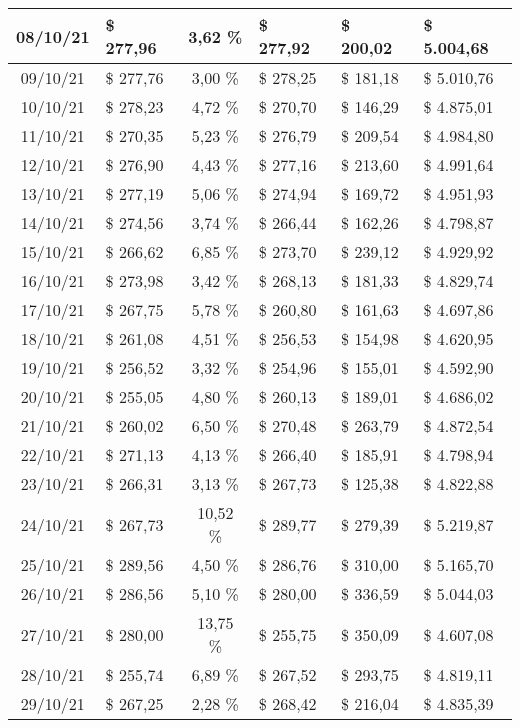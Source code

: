 \begin{center}
\begin{small}
\begin{longtable}{|c|l|c|l|l|l|}
08/10/21 & \$ 277,96 & 3,62 \% & \$ 277,92 & \$ 200,02 & \$ 5.004,68 \\ \hline
09/10/21 & \$ 277,76 & 3,00 \% & \$ 278,25 & \$ 181,18 & \$ 5.010,76 \\ \hline
10/10/21 & \$ 278,23 & 4,72 \% & \$ 270,70 & \$ 146,29 & \$ 4.875,01 \\ \hline
11/10/21 & \$ 270,35 & 5,23 \% & \$ 276,79 & \$ 209,54 & \$ 4.984,80 \\ \hline
12/10/21 & \$ 276,90 & 4,43 \% & \$ 277,16 & \$ 213,60 & \$ 4.991,64 \\ \hline
13/10/21 & \$ 277,19 & 5,06 \% & \$ 274,94 & \$ 169,72 & \$ 4.951,93 \\ \hline
14/10/21 & \$ 274,56 & 3,74 \% & \$ 266,44 & \$ 162,26 & \$ 4.798,87 \\ \hline
15/10/21 & \$ 266,62 & 6,85 \% & \$ 273,70 & \$ 239,12 & \$ 4.929,92 \\ \hline
16/10/21 & \$ 273,98 & 3,42 \% & \$ 268,13 & \$ 181,33 & \$ 4.829,74 \\ \hline
17/10/21 & \$ 267,75 & 5,78 \% & \$ 260,80 & \$ 161,63 & \$ 4.697,86 \\ \hline
18/10/21 & \$ 261,08 & 4,51 \% & \$ 256,53 & \$ 154,98 & \$ 4.620,95 \\ \hline
19/10/21 & \$ 256,52 & 3,32 \% & \$ 254,96 & \$ 155,01 & \$ 4.592,90 \\ \hline
20/10/21 & \$ 255,05 & 4,80 \% & \$ 260,13 & \$ 189,01 & \$ 4.686,02 \\ \hline
21/10/21 & \$ 260,02 & 6,50 \% & \$ 270,48 & \$ 263,79 & \$ 4.872,54 \\ \hline
22/10/21 & \$ 271,13 & 4,13 \% & \$ 266,40 & \$ 185,91 & \$ 4.798,94 \\ \hline
23/10/21 & \$ 266,31 & 3,13 \% & \$ 267,73 & \$ 125,38 & \$ 4.822,88 \\ \hline
24/10/21 & \$ 267,73 & 10,52 \% & \$ 289,77 & \$ 279,39 & \$ 5.219,87 \\ \hline
25/10/21 & \$ 289,56 & 4,50 \% & \$ 286,76 & \$ 310,00 & \$ 5.165,70 \\ \hline
26/10/21 & \$ 286,56 & 5,10 \% & \$ 280,00 & \$ 336,59 & \$ 5.044,03 \\ \hline
27/10/21 & \$ 280,00 & 13,75 \% & \$ 255,75 & \$ 350,09 & \$ 4.607,08 \\ \hline
28/10/21 & \$ 255,74 & 6,89 \% & \$ 267,52 & \$ 293,75 & \$ 4.819,11 \\ \hline
29/10/21 & \$ 267,25 & 2,28 \% & \$ 268,42 & \$ 216,04 & \$ 4.835,39 \\ \hline

\end{longtable}
\end{small}
\end{center}
